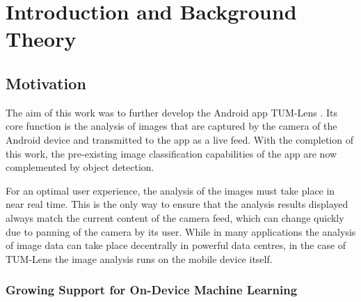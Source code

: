 \documentclass[
			   fontsize=11pt,
               paper=a4,
               bibliography=totoc,
               idxtotoc,
               headsepline,
               footsepline,
               footinclude=false,
               BCOR=12mm,
               DIV=13,
               openany,   %
               oneside    %
               ]
               {scrbook}
\begin{document}
\tableofcontents
\thispagestyle{empty}
\cleardoubleemptypage


\mainmatter

\part{Introduction and Background Theory}

\chapter{Motivation} \label{chap:motivation}

The aim of this work was to further develop the Android app TUM-Lens \cite{lensApp}. Its core function is the analysis of images that are captured by the camera of the Android device and transmitted to the app as a live feed. With the completion of this work, the pre-existing image classification capabilities of the app are now complemented by object detection.

For an optimal user experience, the analysis of the images must take place in near real time. This is the only way to ensure that the analysis results displayed always match the current content of the camera feed, which can change  quickly due to panning of the camera by its user. While in many applications the analysis of image data can take place decentrally in powerful data centres, in the case of TUM-Lens the image analysis runs on the mobile device itself.


\section{Growing Support for On-Device Machine Learning}
\end{document}
